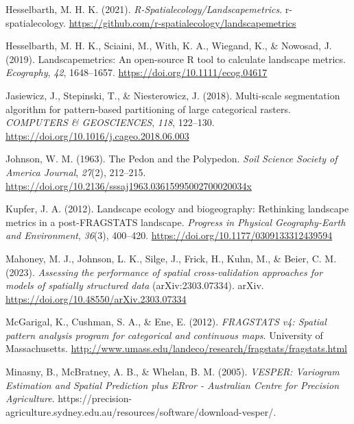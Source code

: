 \documentclass[
  letterpaper,
  DIV=11,
  numbers=noendperiod]{scrartcl}
\newlength{\cslhangindent}
\newlength{\cslentryspacingunit} %
\newenvironment{CSLReferences}[2] %
 {%
  \setlength{\parindent}{0pt}
  \ifodd #1
  \let\oldpar\par
  \def\par{\hangindent=\cslhangindent\oldpar}
  \fi
  \setlength{\parskip}{#2\cslentryspacingunit}
 }%
 {}
\begin{document}
\begin{CSLReferences}{1}{0}
\leavevmode{}%
Hesselbarth, M. H. K. (2021).
\emph{{R-Spatialecology/Landscapemetrics}}. r-spatialecology.
\url{https://github.com/r-spatialecology/landscapemetrics}

\leavevmode{}%
Hesselbarth, M. H. K., Sciaini, M., With, K. A., Wiegand, K., \&
Nowosad, J. (2019). Landscapemetrics: An open-source {R} tool to
calculate landscape metrics. \emph{Ecography}, \emph{42}, 1648--1657.
\url{https://doi.org/10.1111/ecog.04617}

\leavevmode{}%
Jasiewicz, J., Stepinski, T., \& Niesterowicz, J. (2018). Multi-scale
segmentation algorithm for pattern-based partitioning of large
categorical rasters. \emph{COMPUTERS \& GEOSCIENCES}, \emph{118},
122--130. \url{https://doi.org/10.1016/j.cageo.2018.06.003}

\leavevmode{}%
Johnson, W. M. (1963). The {Pedon} and the {Polypedon}. \emph{Soil
Science Society of America Journal}, \emph{27}(2), 212--215.
\url{https://doi.org/10.2136/sssaj1963.03615995002700020034x}

\leavevmode{}%
Kupfer, J. A. (2012). Landscape ecology and biogeography: {Rethinking}
landscape metrics in a post-{FRAGSTATS} landscape. \emph{Progress in
Physical Geography-Earth and Environment}, \emph{36}(3), 400--420.
\url{https://doi.org/10.1177/0309133312439594}

\leavevmode{}%
Mahoney, M. J., Johnson, L. K., Silge, J., Frick, H., Kuhn, M., \&
Beier, C. M. (2023). \emph{Assessing the performance of spatial
cross-validation approaches for models of spatially structured data}
(arXiv:2303.07334). {arXiv}.
\url{https://doi.org/10.48550/arXiv.2303.07334}

\leavevmode{}%
McGarigal, K., Cushman, S. A., \& Ene, E. (2012). \emph{{FRAGSTATS} v4:
{S}patial pattern analysis program for categorical and continuous maps}.
{University of Massachusetts}.
\url{http://www.umass.edu/landeco/research/fragstats/fragstats.html}

\leavevmode{}%
Minasny, B., McBratney, A. B., \& Whelan, B. M. (2005). \emph{{VESPER}:
{Variogram Estimation} and {Spatial Prediction} plus {ERror} -
{Australian Centre} for {Precision Agriculture}}.
https://precision-agriculture.sydney.edu.au/resources/software/download-vesper/.


\end{CSLReferences}
\end{document}
